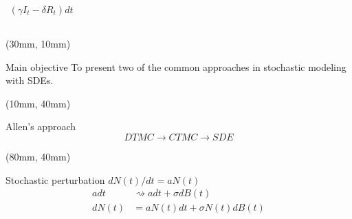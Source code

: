 \begin{frame}
\begin{columns}
\begin{overlayarea}{\textwidth}{.5\textheight}
\begin{exampleblock}
{\begin{align*}
                            (\gamma I_t  - \delta R_t) dt
                    \end{align*}
                }
            \end{exampleblock}
        \end{overlayarea}
    \end{columns}
%
\end{frame}
\begin{frame}[plain]
    \begin{textblock*}{75mm}(30mm, 10mm)
        \begin{alertblock}{Main objective}
            To present two of the common approaches in stochastic modeling
            with SDEs.
        \end{alertblock}
    \end{textblock*}
%
    \begin{textblock*}{40mm}(10mm, 40mm)
        \begin{block}{Allen's approach}
         \begin{equation*}
                DTMC \to CTMC \to SDE 
         \end{equation*}
        \end{block}
    \end{textblock*}    
%
    \begin{textblock*}{40mm}(80mm, 40mm)
        \begin{block}{Stochastic perturbation}
        $dN(t)/dt = a N(t)$
        \begin{align*}
            a dt &
                \rightsquigarrow
            a dt + \sigma dB(t)
            \\
            dN(t) &= aN(t)dt + \sigma N(t) dB(t)
        \end{align*}
        \end{block}
    \end{textblock*}
\end{frame}
